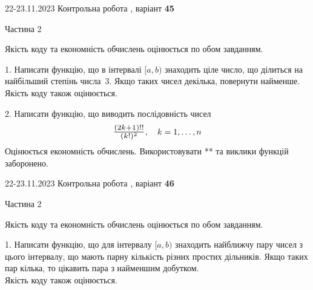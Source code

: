 \documentclass[12pt, ukrainian]{article}
\begin{document}
{{{{{{{{{{{{{{{{%
\begin {Huge}
{{22-23.11.2023 Контрольна робота , варіант  \No \textbf { 45 }\par}}

\begin{center}Частина 2
\end{center}
\vspace{10mm}
\end {Huge}

{
\begin {Large}
Якість коду та економність обчислень оцінюється по обом завданням.

\vspace{5mm}

1. Написати функцію, що в інтервалі $[a, b)$ знаходить ціле число, що ділиться на найбільший степінь числа 3. Якщо таких чисел декілька, повернути найменше.\\	Якість коду також оцінюється. 



\vspace{10mm}



2. 
Написати функцію, що виводить послідовність чисел
$$\scalebox{1.2}{$\frac{(2k+1)!!}{(k!)^2}$}, \quad k=1,\ldots,n$$
Оцінюється економність обчислень. Використовувати ** та виклики функцій заборонено.

\end{Large}\newpage




\begin {Huge}
{{22-23.11.2023 Контрольна робота , варіант  \No \textbf { 46 }\par}}

\begin{center}Частина 2
\end{center}
\vspace{10mm}
\end {Huge}

{
\begin {Large}
Якість коду та економність обчислень оцінюється по обом завданням.

\vspace{5mm}

1. Написати функцію, що для інтервалу $[a, b)$ знаходить найближчу пару чисел з цього інтервалу, що мають парну кількість різних простих дільників. Якщо таких пар кілька, то цікавить пара з найменшим добутком.\\	Якість коду також оцінюється. 




\end{Large}}}}}}}}}}}}}}}}}}}
\end{document}
